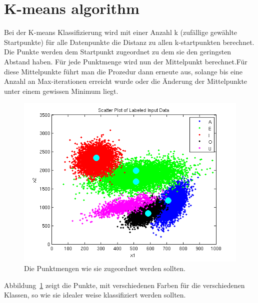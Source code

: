 \section{K-means algorithm}

Bei der K-means Klassifizierung wird  mit einer Anzahl k (zufällige gewählte Startpunkte) für alle Datenpunkte die Distanz zu allen k-startpunkten berechnet. Die Punkte werden dem Startpunkt zugeordnet zu dem sie den geringsten Abstand haben. Für jede Punktmenge wird nun der Mittelpunkt berechnet.Für diese Mittelpunkte führt man die Prozedur dann erneute aus, solange bis eine Anzahl an Max-iterationen erreicht wurde oder die Änderung der Mittelpunkte unter einem gewissen Minimum liegt. 


\begin{figure}[h!]
  \begin{center}
    \includegraphics[width=1.0\textwidth]{./figures/6_2_labeled}
    \caption{Die Punktmengen wie sie zugeordnet werden sollten.}
    \label{fig:6_2_labeled}
  \end{center}
\end{figure}

Abbildung~\ref{fig:6_2_labeled} zeigt die Punkte, mit verschiedenen Farben für die verschiedenen Klassen, so wie sie idealer weise klassifiziert werden sollten.


